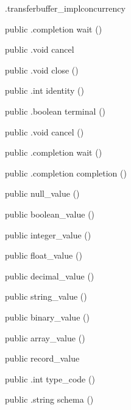 \begin{CrexxClass}{.transferbuffer\_impl}{concurrency}
\begin{Members}
    \Method
      {public}
      {.completion}
      {wait}
      {()}

    \Method
      {public}
      {.void}
      {cancel}
      {}

    \Method
      {public}
      {.void}
      {close}
      {()}

    \Method
      {public}
      {.int}
      {identity}
      {()}

    \Method
      {public}
      {.boolean}
      {terminal}
      {()}

    \Method
      {public}
      {.void}
      {cancel}
      {()}

    \Method
      {public}
      {.completion}
      {wait}
      {()}

    \Method
      {public}
      {.completion}
      {completion}
      {()}

    \Factory
      {public}
      {null\_value}
      {()}

    \Factory
      {public}
      {boolean\_value}
      {()}

    \Factory
      {public}
      {integer\_value}
      {()}

    \Factory
      {public}
      {float\_value}
      {()}

    \Factory
      {public}
      {decimal\_value}
      {()}

    \Factory
      {public}
      {string\_value}
      {()}

    \Factory
      {public}
      {binary\_value}
      {()}

    \Factory
      {public}
      {array\_value}
      {()}

    \Factory
      {public}
      {record\_value}
      {}

    \Method
      {public}
      {.int}
      {type\_code}
      {()}

    \Method
      {public}
      {.string}
      {schema}
      {()}


\end{Members}
\end{CrexxClass}
